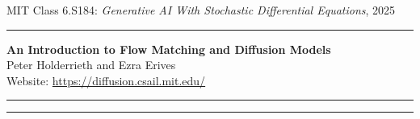 \documentclass[svgnames,dvipsnames]{article}
\date{}
\begin{document}
 
\begin{center}
{MIT Class 6.S184: \textit{Generative AI With Stochastic Differential Equations}, 2025}
\end{center}
\vspace{0.0em}

\hrule
\vspace{0.7em}
\begin{center}
{\Large \bfseries \sffamily An Introduction to Flow Matching and Diffusion Models} \vspace{0.7em}\\
{\normalsize \sffamily 
Peter Holderrieth and Ezra Erives\\
\vspace{0.7em}
Website: \url{https://diffusion.csail.mit.edu/}}
\end{center}

\vspace{0.6em}

\hrule

\doparttoc

\begin{adjustwidth}{1.0cm}{1.0cm}
\tableofcontents
\end{adjustwidth}

\vspace{1.5em}
\hrule

\newpage

\newpage

\newpage

\newpage

\newpage

% 
\newpage 

\printbibliography[
  heading=bibnumbered,
  title={References}
]

\appendix
\newpage


\end{document}
